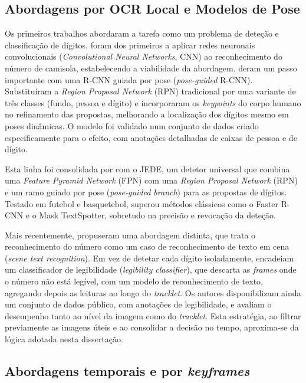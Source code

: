 \subsection{Abordagens por OCR Local e Modelos de Pose}

Os primeiros trabalhos abordaram a tarefa como um problema de deteção e classificação
de dígitos. \citet{gerke2015soccer} foram dos primeiros a aplicar redes neuronais
convolucionais (\emph{Convolutional Neural Networks}, CNN) ao reconhecimento do número
de camisola, estabelecendo a viabilidade da abordagem. \citet{liu2019poseguided} deram
um passo importante com uma R-CNN guiada por pose (\emph{pose-guided} R-CNN). Substituíram
a \emph{Region Proposal Network} (RPN) tradicional por uma variante de três classes
(fundo, pessoa e dígito) e incorporaram os \emph{keypoints} do corpo humano no
refinamento das propostas, melhorando a localização dos dígitos mesmo em poses
dinâmicas. O modelo foi validado num conjunto de dados criado especificamente para o
efeito, com anotações detalhadas de caixas de pessoa e de dígito.

Esta linha foi consolidada por \citet{liu2022jede} com o JEDE, um detetor universal que
combina uma \emph{Feature Pyramid Network} (FPN) com uma \emph{Region Proposal Network}
(RPN) e um ramo guiado por pose (\emph{pose-guided branch}) para as propostas de dígitos.
Testado em futebol e basquetebol, superou métodos clássicos como o Faster R-CNN e o Mask
TextSpotter, sobretudo na precisão e revocação da deteção.

Mais recentemente, \citet{koshkina2024general} propuseram uma abordagem distinta, que
trata o reconhecimento do número como um caso de reconhecimento de texto em cena
(\emph{scene text recognition}). Em vez de detetar cada dígito isoladamente, encadeiam
um classificador de legibilidade (\emph{legibility classifier}), que descarta as
\emph{frames} onde o número não está legível, com um modelo de reconhecimento de texto,
agregando depois as leituras ao longo do \emph{tracklet}. Os autores disponibilizam ainda
um conjunto de dados público, com anotações de legibilidade, e avaliam o desempenho tanto
ao nível da imagem como do \emph{tracklet}. Esta estratégia, ao filtrar previamente as
imagens úteis e ao consolidar a decisão no tempo, aproxima-se da lógica adotada nesta
dissertação.

\subsection{Abordagens temporais e por \emph{keyframes}}

